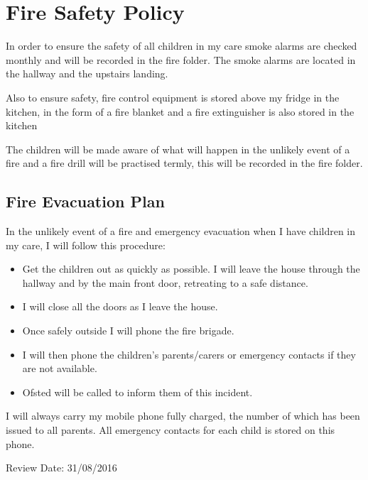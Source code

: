 
\section{Fire Safety Policy}

In order to ensure the safety of all children in my care smoke alarms
are checked monthly and will be recorded in the fire folder. The smoke
alarms are located in the hallway and the upstairs landing.

Also to ensure safety, fire control equipment is stored above my fridge
in the kitchen, in the form of a fire blanket and a fire extinguisher is
also stored in the kitchen

The children will be made aware of what will happen in the unlikely
event of a fire and a fire drill will be practised termly, this
will be recorded in the fire folder.

\subsection{Fire Evacuation Plan}

In the unlikely event of a fire and emergency evacuation when I have
children in my care, I will follow this procedure:

\begin{itemize}
\item
  Get the children out as quickly as possible. I will leave the house
  through the hallway and by the main front door, retreating to a safe
  distance.
\item
  I will close all the doors as I leave the house.
\item
  Once safely outside I will phone the fire brigade.
\item
  I will then phone the children's parents/carers or emergency contacts
  if they are not available.
\item
  Ofsted will be called to inform them of this incident.
\end{itemize}

I will always carry my mobile phone fully charged, the number of which
has been issued to all parents. All emergency contacts for each child is
stored on this phone.

Review Date: 31/08/2016


